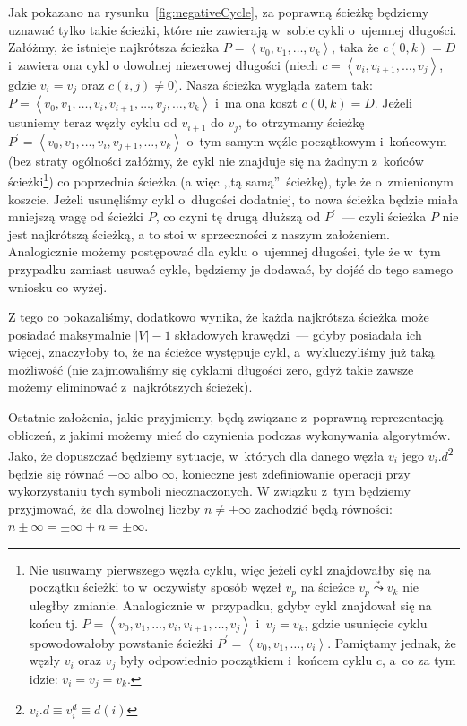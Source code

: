 Jak pokazano na rysunku~\ref{fig:negativeCycle}, za poprawną ścieżkę będziemy uznawać tylko takie ścieżki, które nie zawierają w~sobie cykli o~ujemnej długości.
Załóżmy, że istnieje najkrótsza ścieżka $P = \left \langle v_{0}, v_{1}, \dots, v_{k} \right \rangle$, taka że $c \left( 0, k \right) = D$ i~zawiera ona cykl o dowolnej niezerowej długości (niech $c = \left \langle v_{i}, v_{i+1}, \dots, v_{j} \right \rangle$, gdzie $v_{i} = v_{j}$ oraz $c \left( i, j \right) \neq 0$).
Nasza ścieżka wygląda zatem tak: $P = \left \langle v_{0}, v_{1}, \dots, v_{i}, v_{i+1}, \dots, v_{j}, \dots, v_{k} \right \rangle$ i~ma ona koszt $c \left( 0, k \right) = D$.
Jeżeli usuniemy teraz węzły cyklu od $v_{i+1}$ do $v_{j}$, to otrzymamy ścieżkę $P^{'} = \left \langle v_{0}, v_{1}, \dots, v_{i}, v_{j+1}, \dots, v_{k} \right \rangle$ o~tym samym węźle początkowym i~końcowym (bez straty ogólności załóżmy, że cykl nie znajduje się na żadnym z~końców ścieżki\footnote{
	Nie usuwamy pierwszego węzła cyklu, więc jeżeli cykl znajdowałby się na początku ścieżki to w~oczywisty sposób węzeł $v_{p}$ na ścieżce $v_{p} \overset{*}\leadsto v_{k}$ nie uległby zmianie.
	Analogicznie w~przypadku, gdyby cykl znajdował się na końcu tj. $P = \left \langle v_{0}, v_{1}, \dots, v_{i}, v_{i+1}, \dots, v_{j} \right \rangle$ i~$v_{j}=v_{k}$, gdzie usunięcie cyklu spowodowałoby powstanie ścieżki $P^{'} = \left \langle v_{0}, v_{1}, \dots, v_{i} \right \rangle$.
	Pamiętamy jednak, że węzły $v_{i}$ oraz $v_{j}$ były odpowiednio początkiem i~końcem cyklu $c$, a~co za tym idzie: $v_{i} = v_{j} = v_{k}$.
}) co poprzednia ścieżka (a więc ,,tą samą''~ścieżkę), tyle że o~zmienionym koszcie.
Jeżeli usunęliśmy cykl o~długości dodatniej, to nowa ścieżka będzie miała mniejszą wagę od ścieżki $P$, co czyni tę drugą dłuższą od $P^{'}$~--- czyli ścieżka $P$ nie jest najkrótszą ścieżką, a to stoi w sprzeczności z naszym założeniem.
Analogicznie możemy postępować dla cyklu o~ujemnej długości, tyle że w~tym przypadku zamiast usuwać cykle, będziemy je dodawać, by dojść do tego samego wniosku co wyżej.

Z tego co pokazaliśmy, dodatkowo wynika, że każda najkrótsza ścieżka może posiadać maksymalnie $\left| V \right| - 1$ składowych krawędzi~--- gdyby posiadała ich więcej, znaczyłoby to, że na ścieżce występuje cykl, a~wykluczyliśmy już taką możliwość (nie zajmowaliśmy się cyklami długości zero, gdyż takie zawsze możemy eliminować z~najkrótszych ścieżek).

Ostatnie założenia, jakie przyjmiemy, będą związane z~poprawną reprezentacją obliczeń, z jakimi możemy mieć do czynienia podczas wykonywania algorytmów.
Jako, że dopuszczać będziemy sytuacje, w~których dla danego węzła $v_{i}$ jego $v_{i}.d$\footnote{
	$v_{i}.d \equiv v_{i}^{d} \equiv d \left( i\right)$
} będzie się równać $- \infty$ albo $\infty$, konieczne jest zdefiniowanie operacji przy wykorzystaniu tych symboli nieoznaczonych.
W związku z~tym będziemy przyjmować, że dla dowolnej liczby $n \neq \pm \infty$ zachodzić będą równości: $n \pm \infty = \pm \infty + n = \pm \infty$.

